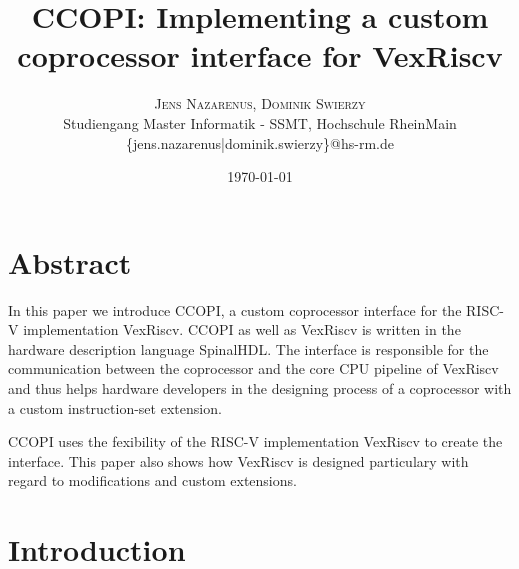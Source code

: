 \documentclass[twoside,twocolumn]{article}
\title{\vspace{-7mm}%
	\fontsize{24pt}{10pt}\selectfont
	\textbf{CCOPI: Implementing a custom coprocessor interface for
    VexRiscv}
	}
\author{%
	\large
	\textsc{Jens Nazarenus, Dominik Swierzy} \\[2mm]
	\normalsize	Studiengang Master Informatik - SSMT, Hochschule RheinMain \\
    \normalsize	\{\;jens.nazarenus|dominik.swierzy\}@hs-rm.de
	}
\date{\today}
\begin{document}
\maketitle
\thispagestyle{fancy}

\section{Abstract}
In this paper we introduce CCOPI, a custom coprocessor interface for the
RISC-V implementation VexRiscv. CCOPI as well as VexRiscv is written in
the hardware description language SpinalHDL. The interface is responsible 
for the communication between the coprocessor and the core CPU pipeline of 
VexRiscv and thus helps hardware developers in the designing process of 
a coprocessor with a custom instruction-set extension.

CCOPI uses the fexibility of the RISC-V implementation VexRiscv to create 
the interface. This paper also shows how VexRiscv is designed particulary with 
regard to modifications and custom extensions. 

\section{Introduction}



\end{document}

